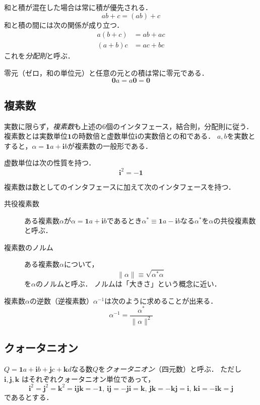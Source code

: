 \documentclass{jsbook}
\newcommand{\keyword}[1]{\emph{#1}}
\newcommand{\zero}{\mathbf{0}}
\newcommand{\one}{\mathbf{1}}
\newcommand{\im}{\mathbf{i}}
\newcommand{\ii}{\mathbf{i}}
\newcommand{\jj}{\mathbf{j}}
\newcommand{\kk}{\mathbf{k}}
\newcommand{\norm}[1]{\|{#1}\|}
\begin{document}
和と積が混在した場合は常に積が優先される．
\begin{equation}
ab+c=(ab)+c
\end{equation}
和と積の間には次の関係が成り立つ．
\begin{align}
a(b+c)&=ab+ac\\
(a+b)c&=ac+bc
\end{align}
これを\keyword{分配則}と呼ぶ．

零元（ゼロ，和の単位元）と任意の元との積は常に零元である．
\begin{equation}
\zero a=a\zero =\zero
\end{equation}

\subsection{複素数}

実数に限らず，\keyword{複素数}も上述の6個のインタフェース，結合則，分配則に従う．
複素数とは実数単位$\one$の時数倍と虚数単位$\im$の実数倍との和である．
$a,b$を実数とすると，$\alpha=\one a+\im b$が複素数の一般形である．

虚数単位は次の性質を持つ．
\begin{equation}
\im^2=-\one
\end{equation}

複素数は数としてのインタフェースに加えて次のインタフェースを持つ．
\begin{description}
\item[共役複素数] ある複素数$\alpha$が$\alpha=\one a+\im b$であるとき$\alpha^*\equiv\one a-\im b$なる$\alpha^*$を$\alpha$の共役複素数と呼ぶ．
\item[複素数のノルム] ある複素数$\alpha$について，
\begin{equation}
\norm{\alpha}\equiv\sqrt{\alpha^*\alpha}
\end{equation}
を$\alpha$のノルムと呼ぶ．
ノルムは「大きさ」という概念に近い．
\end{description}

複素数$\alpha$の逆数（逆複素数）$\alpha^{-1}$は次のように求めることが出来る．
\begin{equation}
\alpha^{-1}=\frac{\alpha^*}{\norm{\alpha}^2}
\end{equation}

\subsection{クォータニオン}

$Q=\one a+\ii b+\jj c+\kk d$なる数$Q$を\keyword{クォータニオン}（四元数）と呼ぶ．
ただし $\ii,\jj,\kk$ はそれぞれクォータニオン単位であって，
\begin{equation}
\ii^2=\jj^2=\kk^2=\ii\jj\kk=-\one,\,
\ii\jj=-\jj\ii=\kk,\,
\jj\kk=-\kk\jj=\ii,\,
\kk\ii=-\ii\kk=\jj
\end{equation}
であるとする．
\end{document}
